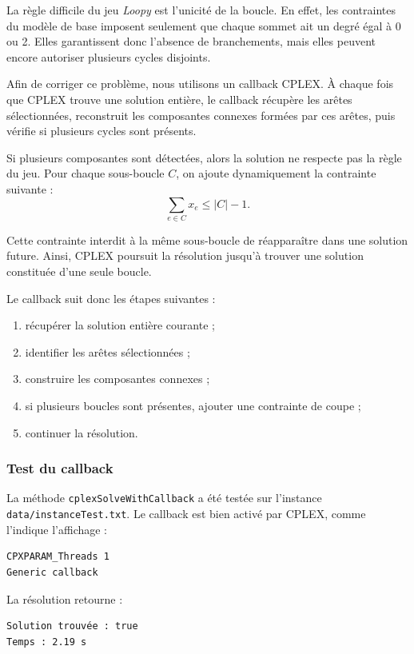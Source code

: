 La règle difficile du jeu \textit{Loopy} est l'unicité de la boucle. En effet, les contraintes du modèle de base imposent seulement que chaque sommet ait un degré égal à 0 ou 2. Elles garantissent donc l'absence de branchements, mais elles peuvent encore autoriser plusieurs cycles disjoints.

Afin de corriger ce problème, nous utilisons un callback CPLEX. À chaque fois que CPLEX trouve une solution entière, le callback récupère les arêtes sélectionnées, reconstruit les composantes connexes formées par ces arêtes, puis vérifie si plusieurs cycles sont présents.

Si plusieurs composantes sont détectées, alors la solution ne respecte pas la règle du jeu. Pour chaque sous-boucle \(C\), on ajoute dynamiquement la contrainte suivante :
\[
\sum_{e \in C} x_e \leq |C|-1.
\]

Cette contrainte interdit à la même sous-boucle de réapparaître dans une solution future. Ainsi, CPLEX poursuit la résolution jusqu'à trouver une solution constituée d'une seule boucle.

Le callback suit donc les étapes suivantes :
\begin{enumerate}
    \item récupérer la solution entière courante ;
    \item identifier les arêtes sélectionnées ;
    \item construire les composantes connexes ;
    \item si plusieurs boucles sont présentes, ajouter une contrainte de coupe ;
    \item continuer la résolution.
\end{enumerate}

\subsubsection{Test du callback}

La méthode \texttt{cplexSolveWithCallback} a été testée sur l'instance \texttt{data/instanceTest.txt}. Le callback est bien activé par CPLEX, comme l'indique l'affichage :
\begin{verbatim}
CPXPARAM_Threads 1
Generic callback
\end{verbatim}

La résolution retourne :
\begin{verbatim}
Solution trouvée : true
Temps : 2.19 s
\end{verbatim}


